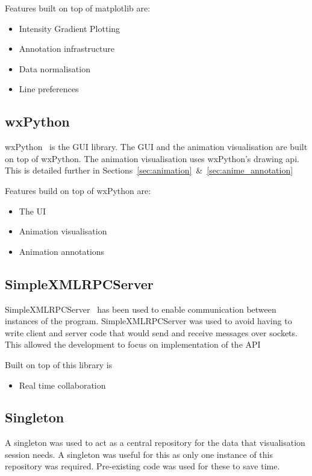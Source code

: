 Features built on top of matplotlib are:
\begin{itemize}
\item Intensity Gradient Plotting
\item Annotation infrastructure
\item Data normalisation
\item Line preferences
\end{itemize}

\subsection{wxPython}

wxPython~\cite{wxpython} is the \ac{GUI} library.  The \ac{GUI} and the animation visualisation are built on top of wxPython.  The animation visualisation uses wxPython's drawing api.  This is detailed further in Sections~\ref{sec:animation}~\&~\ref{sec:anime_annotation}

Features build on top of wxPython are:
\begin{itemize}
\item The \ac{UI}
\item Animation visualisation
\item Animation annotations
\end{itemize}

\subsection{SimpleXMLRPCServer}

SimpleXMLRPCServer~\cite{xmlrpcserver} has been used to enable communication between instances of the program.  SimpleXMLRPCServer was used to avoid having to write client and server code that would send and receive messages over sockets.  This allowed the development to focus on implementation of the \ac{API}

Built on top of this library is
\begin{itemize}
\item Real time collaboration
\end{itemize}

\subsection{Singleton}

A singleton was used to act as a central repository for the data that visualisation session needs.  A singleton was useful for this as only one instance of this repository was required.  Pre-existing code was used for these to save time.

